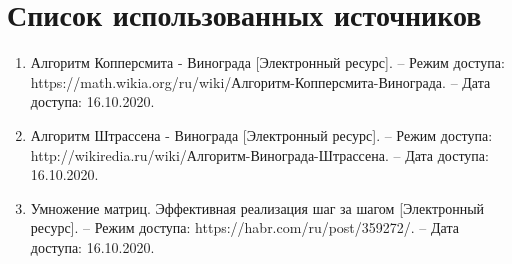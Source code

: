\documentclass[12pt]{report}
\begin{document}
\chapter*{Список использованных источников}
\begin{enumerate}
	\item Алгоритм Копперсмита - Винограда [Электронный ресурс]. – Режим доступа: https://math.wikia.org/ru/wiki/Алгоритм-Копперсмита-Винограда. – Дата доступа: 16.10.2020.
	\item Алгоритм Штрассена - Винограда [Электронный ресурс]. – Режим доступа: http://wikiredia.ru/wiki/Алгоритм-Винограда-Штрассена. – Дата доступа: 16.10.2020.
	\item Умножение матриц. Эффективная реализация шаг за шагом [Электронный ресурс]. – Режим доступа: https://habr.com/ru/post/359272/. – Дата доступа: 16.10.2020.
\end{enumerate}
\end{document}
